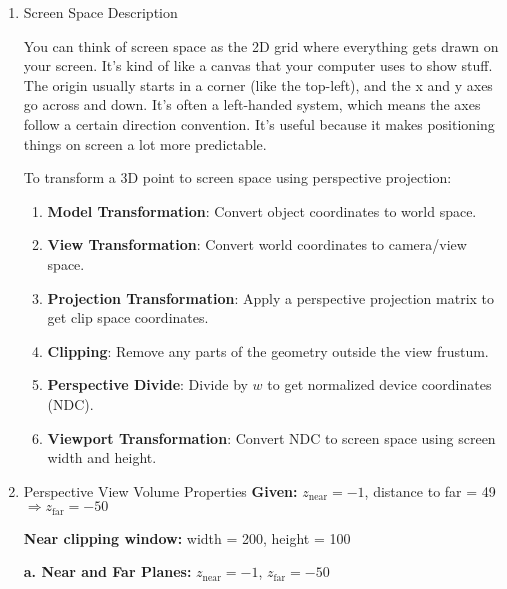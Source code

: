 \documentclass{article}
\begin{document}
 \par
\medskip
{} \par
\medskip
{} \par
\medbreak

\begin{enumerate}
    \item Screen Space Description
    \medbreak
            
    You can think of screen space as the 2D grid where everything gets drawn on your screen. It's kind of like a canvas that your computer uses to show stuff. 
    The origin usually starts in a corner (like the top-left), and the x and y axes go across and down. It’s often a left-handed system, which means the axes follow a certain direction convention. 
    It’s useful because it makes positioning things on screen a lot more predictable.

        \medbreak
        To transform a 3D point to screen space using perspective projection:
        \begin{enumerate}
            \item \textbf{Model Transformation}: Convert object coordinates to world space.
            \item \textbf{View Transformation}: Convert world coordinates to camera/view space.
            \item \textbf{Projection Transformation}: Apply a perspective projection matrix to get clip space coordinates.
            \item \textbf{Clipping}: Remove any parts of the geometry outside the view frustum.
            \item \textbf{Perspective Divide}: Divide by $w$ to get normalized device coordinates (NDC).
            \item \textbf{Viewport Transformation}: Convert NDC to screen space using screen width and height.
        \end{enumerate}

    \item Perspective View Volume Properties
        \medbreak
        \textbf{Given:} $z_{\text{near}} = -1$, distance to far = 49 $\Rightarrow z_{\text{far}} = -50$

        \textbf{Near clipping window:} width = 200, height = 100

        \textbf{a. Near and Far Planes:} $z_{\text{near}} = -1$, $z_{\text{far}} = -50$ 


\end{enumerate}
\end{document}
